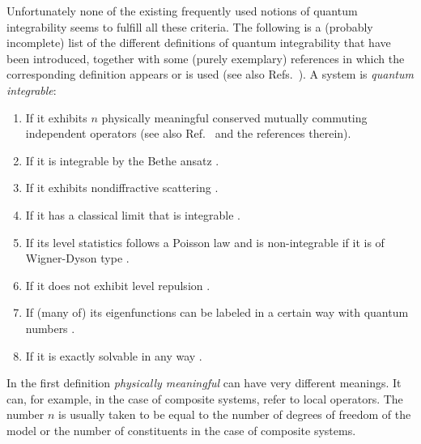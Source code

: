 \documentclass[a4paper,12pt,listof=totoc,index=totoc,bibliography=totoc,headsepline=false,headings=normal,BCOR16.153846mm,DIV12,headinclude,twoside,cleardoublepage=empty,numbers=noenddot,final]{scrreprt}
\theoremstyle{mystyle}
\numberwithin{equation}{section}
\numberwithin{figure}{section}
\numberwithin{lemma}{section}
\numberwithin{theorem}{section}
\numberwithin{corollary}{section}
\numberwithin{definition}{section}
\numberwithin{conjecture}{section}
\numberwithin{observation}{section}
\newcommand{\+}{\mkern2mu}
\DeclareMathOperator{\1}{\mathds{1}}
\begin{document}
Unfortunately none of the existing frequently used notions of quantum integrability seems to fulfill all these criteria.
The following is a (probably incomplete) list of the different definitions of quantum integrability that have been introduced, together with some (purely exemplary) references in which the corresponding definition appears or is used (see also Refs.~\cite{1012.3587v1,PhysRevLett.10-6,sutherland04,Weigert1992}).
A system is \emph{quantum integrable}:
\begin{enumerate}[leftmargin=*]
\item \label{item:npotionsofintegrability_conservedquantity} If it exhibits $n$ physically meaningful conserved mutually commuting independent operators \cite{Rigol07,Braak11,1109.5904v1,Barthel08,Hawkins2008,Jensen1985} (see also Ref.~\cite{Weigert1992} and the references therein).
\item \label{item:npotionsofintegrability_betheansatz} If it is integrable by the Bethe ansatz \cite{sutherland04,Ikeda2013a,Beugeling2013}.
\item \label{item:npotionsofintegrability_nondiffractive} If it exhibits nondiffractive scattering \cite{sutherland04}.
\item \label{item:npotionsofintegrability_classicallimit} If it has a classical limit that is integrable \cite{Castagnino2006}.
\item \label{item:npotionsofintegrability_levelstatistics} If its level statistics follows a Poisson law and is non-integrable if it is of Wigner-Dyson type \cite{Casati1985,1103.0787v1,PhysRevB.82.17,Znidari2013,1111.3375v1,Atas12,Tabor1989,Bohigas1984,Fine2013,Jensen1985}.
\item \label{item:npotionsofintegrability_nolevelrepulsion} If it does not exhibit level repulsion \cite{Stepanov2008,Berry1977a}.
\item \label{item:npotionsofintegrability_quantumnumbers} If (many of) its eigenfunctions can be labeled in a certain way with quantum numbers \cite{Braak11,Berry1977a}.
\item \label{item:npotionsofintegrability_exaxclysolvable} If it is exactly solvable in any way \cite{Beugeling2013,Fendley1995,Braak11,Jensen1985}.
\end{enumerate}
In the first definition \emph{physically meaningful} can have very different meanings.
It can, for example, in the case of composite systems, refer to local operators.
The number $n$ is usually taken to be equal to the number of degrees of freedom of the model or the number of constituents in the case of composite systems.
\end{document}
